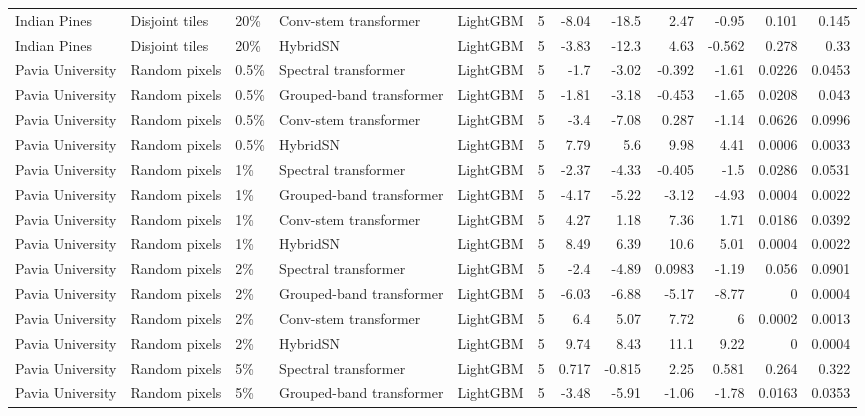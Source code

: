 \begin{table}
\begin{tabular}{lllllrrrrrrr}
Indian Pines & Disjoint tiles & 20\% & Conv-stem transformer & LightGBM & 5 & -8.04 & -18.5 & 2.47 & -0.95 & 0.101 & 0.145 \\
Indian Pines & Disjoint tiles & 20\% & HybridSN & LightGBM & 5 & -3.83 & -12.3 & 4.63 & -0.562 & 0.278 & 0.33 \\
Pavia University & Random pixels & 0.5\% & Spectral transformer & LightGBM & 5 & -1.7 & -3.02 & -0.392 & -1.61 & 0.0226 & 0.0453 \\
Pavia University & Random pixels & 0.5\% & Grouped-band transformer & LightGBM & 5 & -1.81 & -3.18 & -0.453 & -1.65 & 0.0208 & 0.043 \\
Pavia University & Random pixels & 0.5\% & Conv-stem transformer & LightGBM & 5 & -3.4 & -7.08 & 0.287 & -1.14 & 0.0626 & 0.0996 \\
Pavia University & Random pixels & 0.5\% & HybridSN & LightGBM & 5 & 7.79 & 5.6 & 9.98 & 4.41 & 0.0006 & 0.0033 \\
Pavia University & Random pixels & 1\% & Spectral transformer & LightGBM & 5 & -2.37 & -4.33 & -0.405 & -1.5 & 0.0286 & 0.0531 \\
Pavia University & Random pixels & 1\% & Grouped-band transformer & LightGBM & 5 & -4.17 & -5.22 & -3.12 & -4.93 & 0.0004 & 0.0022 \\
Pavia University & Random pixels & 1\% & Conv-stem transformer & LightGBM & 5 & 4.27 & 1.18 & 7.36 & 1.71 & 0.0186 & 0.0392 \\
Pavia University & Random pixels & 1\% & HybridSN & LightGBM & 5 & 8.49 & 6.39 & 10.6 & 5.01 & 0.0004 & 0.0022 \\
Pavia University & Random pixels & 2\% & Spectral transformer & LightGBM & 5 & -2.4 & -4.89 & 0.0983 & -1.19 & 0.056 & 0.0901 \\
Pavia University & Random pixels & 2\% & Grouped-band transformer & LightGBM & 5 & -6.03 & -6.88 & -5.17 & -8.77 & 0 & 0.0004 \\
Pavia University & Random pixels & 2\% & Conv-stem transformer & LightGBM & 5 & 6.4 & 5.07 & 7.72 & 6 & 0.0002 & 0.0013 \\
Pavia University & Random pixels & 2\% & HybridSN & LightGBM & 5 & 9.74 & 8.43 & 11.1 & 9.22 & 0 & 0.0004 \\
Pavia University & Random pixels & 5\% & Spectral transformer & LightGBM & 5 & 0.717 & -0.815 & 2.25 & 0.581 & 0.264 & 0.322 \\
Pavia University & Random pixels & 5\% & Grouped-band transformer & LightGBM & 5 & -3.48 & -5.91 & -1.06 & -1.78 & 0.0163 & 0.0353 \\

\end{tabular}
\end{table}
